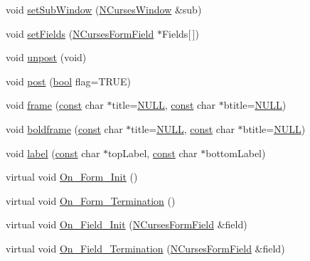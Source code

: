 \begin{DoxyCompactItemize}
void \hyperlink{class_n_curses_form_a9d7e038cd8f2000850ba82f06736b448}{set\-Sub\-Window} (\hyperlink{class_n_curses_window}{N\-Curses\-Window} \&sub)
\item 
void \hyperlink{class_n_curses_form_a494f37fa3f84d1445e547cdeb2c39188}{set\-Fields} (\hyperlink{class_n_curses_form_field}{N\-Curses\-Form\-Field} $\ast$Fields\mbox{[}$\,$\mbox{]})
\item 
void \hyperlink{class_n_curses_form_a09395a54fdcbfecf3824294cd45bb417}{unpost} (void)
\item 
void \hyperlink{class_n_curses_form_a436d2447e2502076353970f0046684d9}{post} (\hyperlink{term__entry_8h_a002004ba5d663f149f6c38064926abac}{bool} flag=T\-R\-U\-E)
\item 
void \hyperlink{class_n_curses_form_a806982e242e62e499182eda5b5a9212e}{frame} (\hyperlink{term__entry_8h_a57bd63ce7f9a353488880e3de6692d5a}{const} char $\ast$title=\hyperlink{internal_8h_a070d2ce7b6bb7e5c05602aa8c308d0c4}{N\-U\-L\-L}, \hyperlink{term__entry_8h_a57bd63ce7f9a353488880e3de6692d5a}{const} char $\ast$btitle=\hyperlink{internal_8h_a070d2ce7b6bb7e5c05602aa8c308d0c4}{N\-U\-L\-L})
\item 
void \hyperlink{class_n_curses_form_a6d03daea0425834ca7c6c4d94d1bb2d0}{boldframe} (\hyperlink{term__entry_8h_a57bd63ce7f9a353488880e3de6692d5a}{const} char $\ast$title=\hyperlink{internal_8h_a070d2ce7b6bb7e5c05602aa8c308d0c4}{N\-U\-L\-L}, \hyperlink{term__entry_8h_a57bd63ce7f9a353488880e3de6692d5a}{const} char $\ast$btitle=\hyperlink{internal_8h_a070d2ce7b6bb7e5c05602aa8c308d0c4}{N\-U\-L\-L})
\item 
void \hyperlink{class_n_curses_form_af82f845120fd7ca1c6b0a3e93914df2e}{label} (\hyperlink{term__entry_8h_a57bd63ce7f9a353488880e3de6692d5a}{const} char $\ast$top\-Label, \hyperlink{term__entry_8h_a57bd63ce7f9a353488880e3de6692d5a}{const} char $\ast$bottom\-Label)
\item 
virtual void \hyperlink{class_n_curses_form_a488c9a4a08fce407b2d4d60a31a5b5a2}{On\-\_\-\-Form\-\_\-\-Init} ()
\item 
virtual void \hyperlink{class_n_curses_form_adb5c89d2b7c23735d8dd223146abe573}{On\-\_\-\-Form\-\_\-\-Termination} ()
\item 
virtual void \hyperlink{class_n_curses_form_a51451ce21574923f25663c9d713727e7}{On\-\_\-\-Field\-\_\-\-Init} (\hyperlink{class_n_curses_form_field}{N\-Curses\-Form\-Field} \&field)
\item 
virtual void \hyperlink{class_n_curses_form_a91c60704a31b0b1cf471e6c27f23bd8d}{On\-\_\-\-Field\-\_\-\-Termination} (\hyperlink{class_n_curses_form_field}{N\-Curses\-Form\-Field} \&field)

\end{DoxyCompactItemize}
